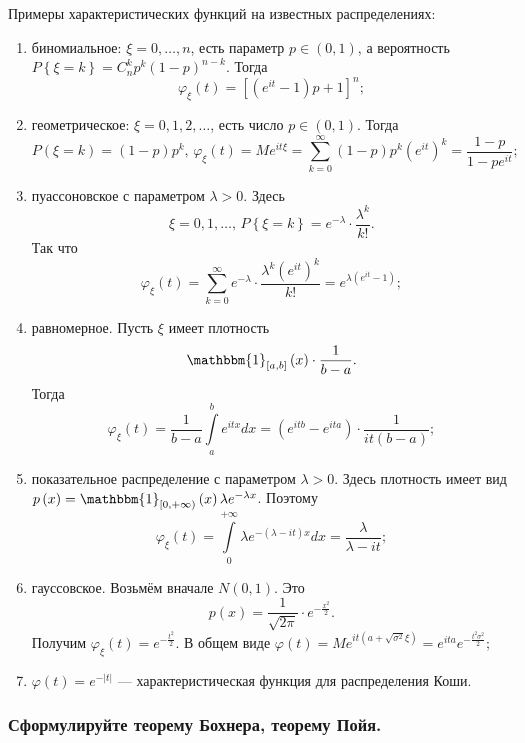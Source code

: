 Примеры характеристических функций на известных распределениях:
\begin{enumerate}
\item биномиальное: $ \xi = 0, \dotsc, n$, есть параметр $p \in \left( 0, 1 \right) $, а вероятность $P \left\{ \xi = k \right\} = C_n^k p^k \left( 1 - p \right)^{n-k}$.
Тогда
$$ \varphi_{ \xi } \left( t \right) =
\left[ \left( e^{it} - 1 \right) p + 1 \right]^n;$$
\item геометрическое: $ \xi = 0, 1, 2, \dotsc $, есть число $p \in \left( 0, 1 \right) $.
Тогда
$$P \left( \xi = k \right) = \left( 1-p \right) p^k, \,
\varphi_{ \xi } \left( t \right) = Me^{it \xi } = \sum \limits_{k=0}^{ \infty } \left( 1-p \right) p^k \left( e^{it} \right)^k = \frac{1-p}{1-pe^{it}};$$
\item пуассоновское с параметром $ \lambda > 0$.
Здесь
$$ \xi = 0, 1, \dotsc, \,
P \left\{ \xi = k \right\} = e^{- \lambda } \cdot \frac{ \lambda^k}{k!}.$$
Так что
$$ \varphi_{ \xi } \left( t \right) =
\sum \limits_{k=0}^{ \infty } e^{- \lambda } \cdot \frac{ \lambda^k \left( e^{it} \right)^k}{k!} =
e^{ \lambda \left( e^{it} - 1 \right) };$$
\item равномерное.
Пусть $ \xi $ имеет плотность
$$ \mathbbm{1}_{ \left[ a, b \right] } \left( x \right) \cdot \frac{1}{b-a}.$$
Тогда
$$ \varphi_{ \xi } \left( t \right) =
\frac{1}{b-a} \int \limits_a^b e^{itx} dx =
\left( e^{itb} - e^{ita} \right) \cdot \frac{1}{it \left( b-a \right)};$$
\item показательное распределение с параметром $ \lambda > 0$.
Здесь плотность имеет вид $p \left( x \right) = \mathbbm{1}_{ \left[ 0, + \infty \right) } \left( x \right) \lambda e^{- \lambda x}$.
Поэтому
$$ \varphi_{ \xi } \left( t \right) =
\int \limits_0^{+ \infty } \lambda e^{- \left( \lambda - it \right) x} dx =
\frac{ \lambda }{ \lambda - it};$$
\item гауссовское.
Возьмём вначале $N \left( 0, 1 \right) $.
Это
$$p \left( x \right) =
\frac{1}{ \sqrt{2 \pi }} \cdot e^{- \frac{x^2}{2}}.$$
Получим $ \varphi_{ \xi } \left( t \right) = e^{- \frac{t^2}{2}}$.
В общем виде $ \varphi \left( t \right) = Me^{it \left( a + \sqrt{ \sigma^2} \xi \right) } = e^{ita} e^{- \frac{t^2 \sigma^2}{2}}$;
\item $ \varphi \left( t \right) = e^{- \left| t \right| }$ --- характеристическая функция для распределения Коши.
\end{enumerate}

\subsubsection*{Сформулируйте теорему Бохнера, теорему Пойя.}

